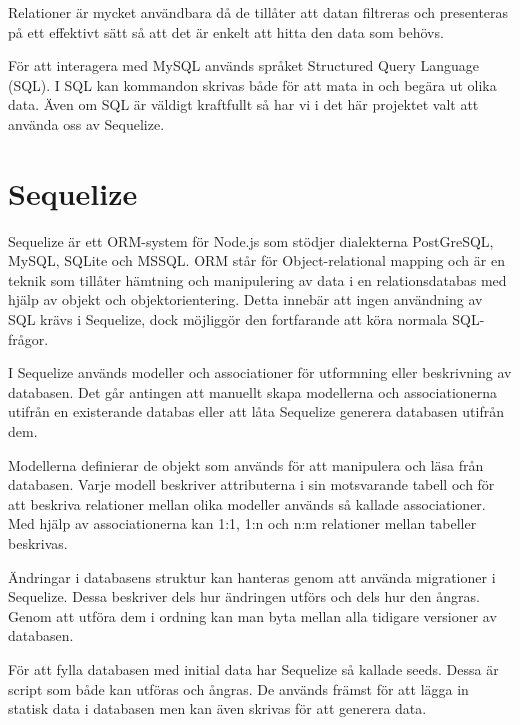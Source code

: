 Relationer är mycket användbara då de tillåter att datan filtreras och presenteras på ett effektivt sätt så att det är enkelt att hitta den data som behövs.

För att interagera med MySQL används språket Structured Query Language (SQL). I SQL kan kommandon skrivas både för att mata in och begära ut olika data. Även om SQL är väldigt kraftfullt så har vi i det här projektet valt att använda oss av Sequelize.


\section{Sequelize}
Sequelize är ett ORM-system för Node.js som stödjer dialekterna PostGreSQL, MySQL, SQLite och MSSQL. \cite{sequelize} ORM står för Object-relational mapping och är en teknik som tillåter hämtning och manipulering av data i en relationsdatabas med hjälp av objekt och objektorientering. Detta innebär att ingen användning av SQL krävs i Sequelize, dock möjliggör den fortfarande att köra normala SQL-frågor.

I Sequelize används modeller och associationer för utformning eller beskrivning av databasen. Det går antingen att manuellt skapa modellerna och associationerna utifrån en existerande databas eller att låta Sequelize generera databasen utifrån dem.

Modellerna definierar de objekt som används för att manipulera och läsa från databasen. Varje modell beskriver attributerna i sin motsvarande tabell och för att beskriva relationer mellan olika modeller används så kallade associationer. Med hjälp av associationerna kan 1:1, 1:n och n:m relationer mellan tabeller beskrivas.

Ändringar i databasens struktur kan hanteras genom att använda migrationer i Sequelize. Dessa beskriver dels hur ändringen utförs och dels hur den ångras. Genom att utföra dem i ordning kan man byta mellan alla tidigare versioner av databasen. \cite{migrations}

För att fylla databasen med initial data har Sequelize så kallade seeds. Dessa är script som både kan utföras och ångras. De används främst för att lägga in statisk data i databasen men kan även skrivas för att generera data.